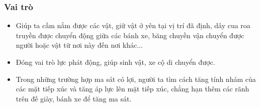 \subsubsection{Vai trò}
\begin{itemize}
	\item Giúp ta cầm nắm được các vật, giữ vật ở yên tại vị trí đã định, dây cua roa truyền được chuyển động giữa các bánh xe, băng chuyền vận chuyển được người hoặc vật từ nơi này đến nơi khác...
	\item Đóng vai trò lực phát động, giúp sinh vật, xe cộ di chuyển được.
	\item Trong những trường hợp ma sát có lợi, người ta tìm cách tăng tính nhám của các mặt tiếp xúc và tăng áp lực lên mặt tiếp xúc, chẳng hạn thêm các rãnh trên đế giày, bánh xe để tăng ma sát.
\end{itemize}
